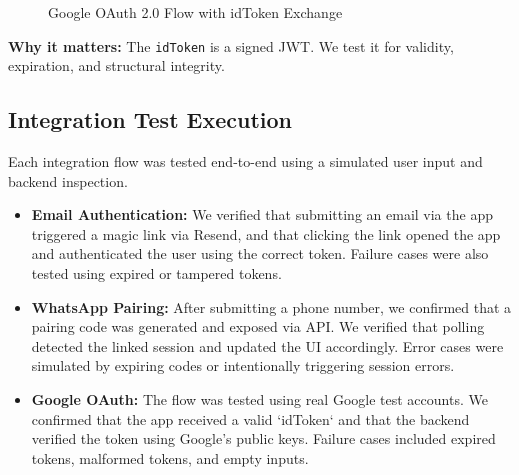 \begin{figure}[h!]
    \centering
    \caption{Google OAuth 2.0 Flow with idToken Exchange}
    \label{fig:oauth-flow}
\end{figure}
    

\textbf{Why it matters:} The \texttt{idToken} is a signed JWT. We test it for validity, expiration, and structural integrity.

\subsection*{Integration Test Execution}

Each integration flow was tested end-to-end using a simulated user input and backend inspection.

\begin{itemize}
    \item \textbf{Email Authentication:} We verified that submitting an email via the app triggered a magic link via Resend, and that clicking the link opened the app and authenticated the user using the correct token. Failure cases were also tested using expired or tampered tokens.
    \item \textbf{WhatsApp Pairing:} After submitting a phone number, we confirmed that a pairing code was generated and exposed via API. We verified that polling detected the linked session and updated the UI accordingly. Error cases were simulated by expiring codes or intentionally triggering session errors.
    \item \textbf{Google OAuth:} The flow was tested using real Google test accounts. We confirmed that the app received a valid `idToken` and that the backend verified the token using Google's public keys. Failure cases included expired tokens, malformed tokens, and empty inputs.
\end{itemize}

